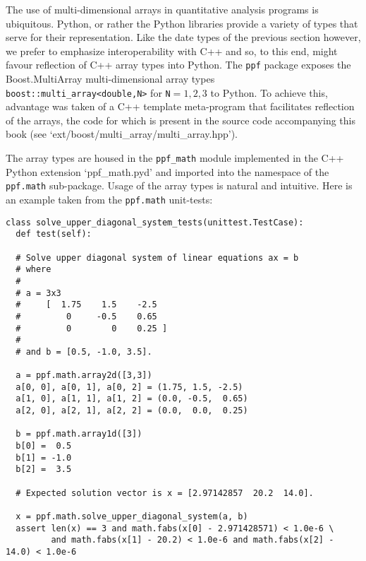 The use of multi-dimensional arrays in quantitative analysis programs
is ubiquitous. Python, or rather the Python libraries provide a
variety of types that serve for their representation. Like the date
types of the previous section however, we prefer to emphasize
interoperability with C++ and so, to this end, might favour reflection
of C++ array types into Python. The \verb|ppf| package exposes the
Boost.MultiArray multi-dimensional array types \\
\verb|boost::multi_array<double,N>| for \verb|N|$ = 1, 2, 3$ to
Python. To achieve this, advantage was taken of a C++ template
meta-program that facilitates reflection of the arrays, the code for
which is present in the source code accompanying this book (see
`ext/boost/multi\_array/multi\_array.hpp').

The array types are housed in the \verb|ppf_math| module implemented
in the C++ Python extension `ppf\_math.pyd' and imported into
the namespace of the \verb|ppf.math| sub-package. Usage of the array
types is natural and intuitive. Here is an example taken from the
\verb|ppf.math| unit-tests:
\begin{verbatim}
class solve_upper_diagonal_system_tests(unittest.TestCase):
  def test(self):
    
  # Solve upper diagonal system of linear equations ax = b
  # where
  #
  # a = 3x3
  #     [  1.75    1.5    -2.5
  #         0     -0.5    0.65
  #         0        0    0.25 ]
  #
  # and b = [0.5, -1.0, 3.5].
  
  a = ppf.math.array2d([3,3])
  a[0, 0], a[0, 1], a[0, 2] = (1.75, 1.5, -2.5)
  a[1, 0], a[1, 1], a[1, 2] = (0.0, -0.5,  0.65)
  a[2, 0], a[2, 1], a[2, 2] = (0.0,  0.0,  0.25)

  b = ppf.math.array1d([3])
  b[0] =  0.5
  b[1] = -1.0
  b[2] =  3.5
  
  # Expected solution vector is x = [2.97142857  20.2  14.0].
  
  x = ppf.math.solve_upper_diagonal_system(a, b)
  assert len(x) == 3 and math.fabs(x[0] - 2.971428571) < 1.0e-6 \
         and math.fabs(x[1] - 20.2) < 1.0e-6 and math.fabs(x[2] - 14.0) < 1.0e-6
\end{verbatim}

